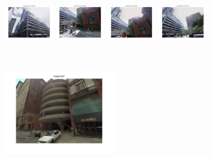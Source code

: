 \begin{figure}[h]
\begin{minipage}{0.75\linewidth}
\begin{minipage}{\linewidth}
            \end{minipage}
            \\
            \begin{minipage}{\linewidth}
                \colorbox{myRed}{\includegraphics[trim = 35mm 30mm 35mm 30mm, clip=true, height=16mm]{imgs/Pval/exImproved02/improved01.jpg}}
                \colorbox{myRed}{\includegraphics[trim = 35mm 30mm 35mm 30mm, clip=true, height=16mm]{imgs/Pval/exImproved02/improved02.jpg}}
                \colorbox{myRed}{\includegraphics[trim = 35mm 30mm 35mm 30mm, clip=true, height=16mm]{imgs/Pval/exImproved02/improved03.jpg}}
                \colorbox{myRed}{\includegraphics[trim = 35mm 30mm 35mm 30mm, clip=true, height=16mm]{imgs/Pval/exImproved02/improved04.jpg}}
            \end{minipage} 
        \end{minipage}
        \vspace{3mm}
        \\
        \begin{minipage}{0.34\linewidth}
            \centering
            \vspace{0mm}
            \includegraphics[trim = 45mm 40mm 45mm 30mm, clip=true, height=36mm]{imgs/Pval/exImproved04/query.jpg}

\end{minipage}
\end{figure}
